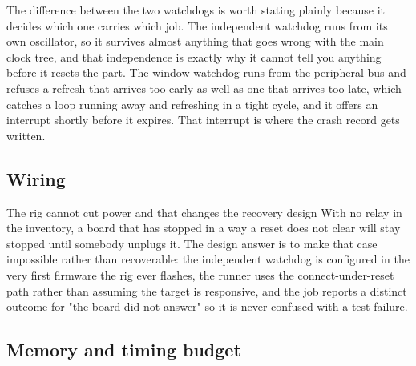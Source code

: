 The difference between the two watchdogs is worth stating plainly because it
decides which one carries which job. The independent watchdog runs from its own
oscillator, so it survives almost anything that goes wrong with the main clock
tree, and that independence is exactly why it cannot tell you anything before it
resets the part. The window watchdog runs from the peripheral bus and refuses a
refresh that arrives too early as well as one that arrives too late, which
catches a loop running away and refreshing in a tight cycle, and it offers an
interrupt shortly before it expires. That interrupt is where the crash record
gets written.

\subsection*{Wiring}


\begin{note}{The rig cannot cut power and that changes the recovery design}
With no relay in the inventory, a board that has stopped in a way a reset does
not clear will stay stopped until somebody unplugs it. The design answer is to
make that case impossible rather than recoverable: the independent watchdog is
configured in the very first firmware the rig ever flashes, the runner uses the
connect-under-reset path rather than assuming the target is responsive, and the
job reports a distinct outcome for "the board did not answer" so it is never
confused with a test failure.
\end{note}

\subsection*{Memory and timing budget}


